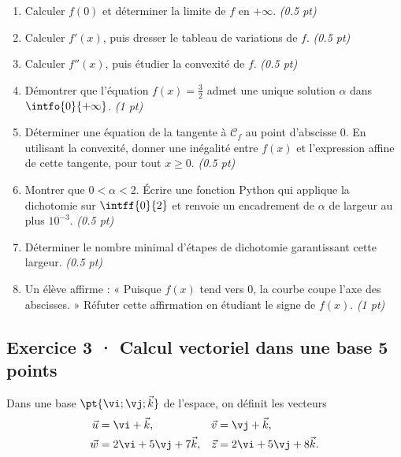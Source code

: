 \begin{enumerate}

\item Calculer $f(0)$ et déterminer la limite de $f$ en $+\infty$. \hfill\textit{(\num{0,5} pt)}

\item Calculer $f' (x)$, puis dresser le tableau de variations de $f$. \hfill\textit{(\num{0,5} pt)}

\item Calculer $f'' (x)$, puis étudier la convexité de $f$. \hfill\textit{(\num{0,5} pt)}

\item Démontrer que l'équation $f(x)=\frac{3}{2}$ admet une unique solution $\alpha$ dans $\intfo{0}{+\infty}$. \hfill\textit{(1 pt)}

\item Déterminer une équation de la tangente à $\mathcal C_f$ au point d'abscisse $0$. En utilisant la convexité, donner une inégalité entre $f(x)$ et l'expression affine de cette tangente, pour tout $x\ge0$. \hfill\textit{(\num{0,5} pt)}

\item Montrer que $0<\alpha<2$. Écrire une fonction Python qui applique la dichotomie sur $\intff{0}{2}$ et renvoie un encadrement de $\alpha$ de largeur au plus $10^{-3}$. \hfill\textit{(\num{0,5} pt)}

\item Déterminer le nombre minimal d'étapes de dichotomie garantissant cette largeur. \hfill\textit{(\num{0,5} pt)}

\item Un élève affirme : « Puisque $f(x)$ tend vers $0$, la courbe coupe l'axe des abscisses. » Réfuter cette affirmation en étudiant le signe de $f(x)$. \hfill\textit{(1 pt)}

\end{enumerate}

\mxnewpage{}

\subsection*{Exercice 3 · Calcul vectoriel dans une base \hfill 5 points}Dans une base $\pt{\vi;\vj;\vec k}$ de l'espace, on définit les vecteurs
\[\begin{aligned}\vec u&=\vi+\vec k,&\vec v&=\vj+\vec k,\\
\vec w&=2\vi+5\vj+7\vec k,&\vec z&=2\vi+5\vj+8\vec k.\end{aligned}\]

